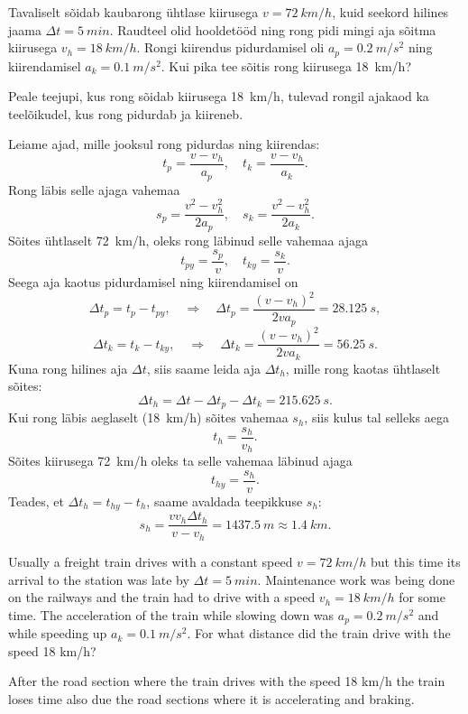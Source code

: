 
Tavaliselt sõidab kaubarong ühtlase kiirusega $v=\SI{72}{km/h}$, kuid seekord hilines jaama $\Delta t=\SI{5}{min}$. Raudteel olid hooldetööd ning rong pidi mingi aja sõitma kiirusega $v_{h}=\SI{18}{km/h}$. Rongi kiirendus pidurdamisel oli $a_p=\SI{0,2}{m/s^2}$ ning kiirendamisel $a_k=\SI{0,1}{m/s^2}$. Kui pika tee sõitis rong kiirusega \SI{18}{km/h}?

\hint
Peale teejupi, kus rong sõidab kiirusega \SI{18}{km/h}, tulevad rongil ajakaod ka teelõikudel, kus rong pidurdab ja kiireneb.

\solu
Leiame ajad, mille jooksul rong pidurdas ning kiirendas:
\[ t_p = \frac{v - v_h}{a_p},\quad t_k = \frac{v-v_h}{a_k}. \]
Rong läbis selle ajaga vahemaa
\[ s_p = \frac{v^2-v_h^2}{2a_p}, \quad s_k = \frac{v^2-v_h^2}{2a_k}. \]
Sõites ühtlaselt \SI{72}{km/h}, oleks rong läbinud selle vahemaa ajaga
\[ t_{py} = \frac{s_p}{v},\quad t_{ky} =\frac{s_k}{v}. \]
Seega aja kaotus pidurdamisel ning kiirendamisel on 
\[ \Delta t_p = t_{p} - t_{py}, \quad\Rightarrow\quad \Delta t_p = \frac{(v-v_h)^2}{2va_p}=\SI{28,125}{s},\]
\[ \Delta t_k = t_{k} - t_{ky}, \quad\Rightarrow\quad \Delta t_k = \frac{(v-v_h)^2}{2va_k}=\SI{56,25}{s}.\]
Kuna rong hilines aja $\Delta t$, siis saame leida aja $\Delta t_h$, mille rong kaotas ühtlaselt sõites:
\[ \Delta t_h = \Delta t - \Delta t_p - \Delta t_k = \SI{215,625}{s}. \]
Kui rong läbis aeglaselt (\SI{18}{km/h}) sõites vahemaa $s_h$, siis kulus tal selleks aega
\[ t_h = \frac{s_h}{v_h}. \]
Sõites kiirusega \SI{72}{km/h} oleks ta selle vahemaa läbinud ajaga
\[ t_{hy} = \frac{s_h}{v}. \]
Teades, et $\Delta t_h = t_{hy} - t_h$, saame avaldada teepikkuse $s_h$:
\[ s_h = \frac{vv_h\Delta t_h}{v-v_h} = \SI{1437,5}{m} \approx \SI{1,4}{km}.\] 

Usually a freight train drives with a constant speed $v=\SI{72}{km/h}$ but this time its arrival to the station was late by $\Delta t=\SI{5}{min}$. Maintenance work was being done on the railways and the train had to drive with a speed $v_{h}=\SI{18}{km/h}$ for some time. The acceleration of the train while slowing down was $a_p=\SI{0,2}{m/s^2}$ and while speeding up $a_k=\SI{0,1}{m/s^2}$. For what distance did the train drive with the speed 18 km/h?

\hinteng
After the road section where the train drives with the speed 18 km/h the train loses time also due the road sections where it is accelerating and braking.


